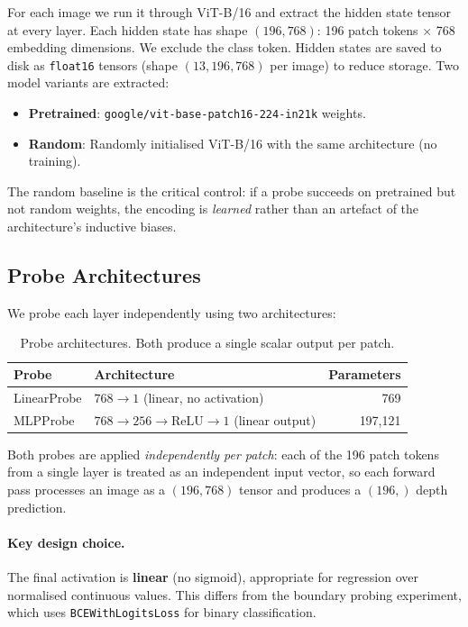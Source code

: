 \documentclass[11pt,a4paper]{article}
\begin{document}
For each image we run it through ViT-B/16 and extract the hidden state tensor
at every layer.  Each hidden state has shape $(196, 768)$: 196 patch tokens
$\times$ 768 embedding dimensions.  We exclude the class token.  Hidden
states are saved to disk as \texttt{float16} tensors (shape $(13, 196, 768)$
per image) to reduce storage.  Two model variants are extracted:
\begin{itemize}[noitemsep]
    \item \textbf{Pretrained}: \texttt{google/vit-base-patch16-224-in21k}
          weights.
    \item \textbf{Random}: Randomly initialised ViT-B/16 with the same
          architecture (no training).
\end{itemize}
The random baseline is the critical control: if a probe succeeds on pretrained
but not random weights, the encoding is \emph{learned} rather than an
artefact of the architecture's inductive biases.

\subsection{Probe Architectures}

We probe each layer independently using two architectures:

\begin{table}[H]
\centering
\caption{Probe architectures.  Both produce a single scalar output per patch.}
\begin{tabular}{llr}
\toprule
Probe & Architecture & Parameters \\
\midrule
LinearProbe & $768 \to 1$ (linear, no activation) & 769 \\
MLPProbe    & $768 \to 256 \to \text{ReLU} \to 1$ (linear output) & 197,121 \\
\bottomrule
\end{tabular}
\label{tab:probes}
\end{table}

Both probes are applied \emph{independently per patch}: each of the 196 patch
tokens from a single layer is treated as an independent input vector, so each
forward pass processes an image as a $(196, 768)$ tensor and produces a
$(196,)$ depth prediction.

\paragraph{Key design choice.}
The final activation is \textbf{linear} (no sigmoid), appropriate for
regression over normalised continuous values.  This differs from the boundary
probing experiment, which uses \texttt{BCEWithLogitsLoss} for binary
classification.
\end{document}
